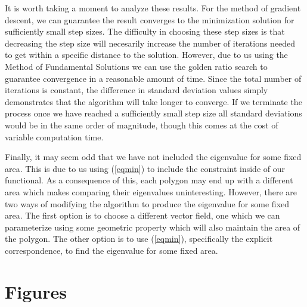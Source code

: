 \documentclass[12pt]{report}
\numberwithin{definition}{section}
\begin{document}
It is worth taking a moment to analyze these results.
For the method of gradient descent, we can guarantee the result converges to the minimization solution for sufficiently small step sizes\cite{curry}.
The difficulty in choosing these step sizes is that decreasing the step size will necesarily increase the number of iterations needed to get within a specific distance to the solution.
However, due to us using the Method of Fundamental Solutions we can use the golden ratio search to guarantee convergence in a reasonable amount of time.
Since the total number of iterations is constant, the difference in standard deviation values simply demonstrates that the algorithm will take longer to converge. 
If we terminate the process once we have reached a sufficiently small step size all standard deviations would be in the same order of magnitude, though this comes at the cost of variable computation time. 

Finally, it may seem odd that we have not included the eigenvalue for some fixed area.
This is due to us using (\ref{eqmin}) to include the constraint inside of our functional.
As a consequence of this, each polygon may end up with a different area which makes comparing their eigenvalues uninteresting.
However, there are two ways of modifying the algorithm to produce the eigenvalue for some fixed area.
The first option is to choose a different vector field, one which we can parameterize using some geometric property which will also maintain the area of the polygon.
The other option is to use (\ref{eqmin}), specifically the explicit correspondence, to find the eigenvalue for some fixed area.



\break

\section{Figures}



\break
 
\end{document}

